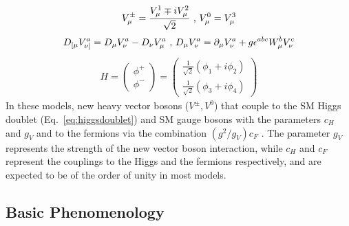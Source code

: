 \begin{align}
  V_{\mu}^{\pm}=\frac{V_{\mu}^{1}\mp iV_{\mu}^{2}}{\sqrt{2}}\textup{ , }V_{\mu}^{0}=V_{\mu}^{3}
\end{align}
\begin{align}
  D_{[\mu}V_{\nu]}^{a} = D_{\mu}V_{\nu}^{a}-D_{\nu}V_{\mu}^{a}\textup{ , }D_{\mu}V_{\nu}^{a}=\partial_{\mu}V_{\nu}^{a}+g\epsilon^{abc}W_{\mu}^{b}V_{\nu}^{c}
\end{align}
\begin{align}
  \label{eq:higgsdoublet}
  H=
  \begin{pmatrix}
    \phi^{+}\\
    \phi^{-}
  \end{pmatrix}
  =
  \begin{pmatrix}
    \frac{1}{\sqrt{2}}(\phi_{1}+i\phi_{2})\\
    \frac{1}{\sqrt{2}}(\phi_{3}+i\phi_{4})
  \end{pmatrix}
\end{align}
\newline In these models, new heavy vector bosons ($V^{\pm}, V^{0}$) that couple to the SM Higgs doublet (Eq.~\ref{eq:higgsdoublet}) and SM gauge bosons with the parameters $c_{H}$ and $g_{V}$ and to the fermions via the combination $(g^{2}/g_{V})c_{F}$ . The parameter $g_{V}$ represents the strength of the new vector boson interaction, while $c_{H}$ and $c_{F}$ represent the couplings to the Higgs and the fermions respectively, and are expected to be of the order of unity in most models. 


\subsection{Basic Phenomenology}
